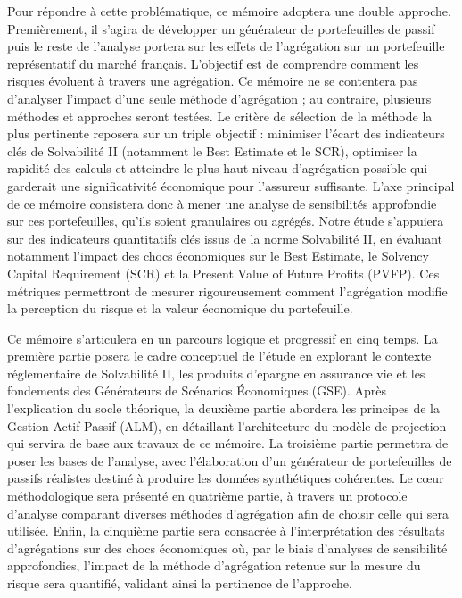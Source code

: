 Pour répondre à cette problématique, ce mémoire adoptera une double approche. Premièrement, il s'agira de développer un générateur de portefeuilles de passif puis le reste de l'analyse portera sur les effets de l'agrégation sur un portefeuille représentatif du marché français. L'objectif est de comprendre comment les risques évoluent à travers une agrégation. Ce mémoire ne se contentera pas d'analyser l'impact d'une seule méthode d'agrégation ; au contraire, plusieurs méthodes et approches seront testées. Le critère de sélection de la méthode la plus pertinente reposera sur un triple objectif : minimiser l'écart des indicateurs clés de Solvabilité II (notamment le Best Estimate et le SCR), optimiser la rapidité des calculs et atteindre le plus haut niveau d'agrégation possible qui garderait une significativité économique pour l'assureur suffisante. L'axe principal de ce mémoire consistera donc à mener une analyse de sensibilités approfondie sur ces portefeuilles, qu'ils soient granulaires ou agrégés. Notre étude s'appuiera sur des indicateurs quantitatifs clés issus de la norme Solvabilité II, en évaluant notamment l'impact des chocs économiques sur le Best Estimate, le Solvency Capital Requirement (SCR) et la Present Value of Future Profits (PVFP). Ces métriques permettront de mesurer rigoureusement comment l'agrégation modifie la perception du risque et la valeur économique du portefeuille.

Ce mémoire s'articulera en un parcours logique et progressif en cinq temps. La première partie posera le cadre conceptuel de l'étude en explorant le contexte réglementaire de Solvabilité II, les produits d'epargne en assurance vie et les fondements des Générateurs de Scénarios Économiques (GSE). Après l'explication du socle théorique, la deuxième partie abordera les principes de la Gestion Actif-Passif (ALM), en détaillant l'architecture du modèle de projection qui servira de base aux travaux de ce mémoire. La troisième partie permettra de poser les bases de l'analyse, avec l'élaboration d'un générateur de portefeuilles de passifs réalistes destiné à produire les données synthétiques cohérentes. Le cœur méthodologique sera présenté en quatrième partie, à travers un protocole d'analyse comparant diverses méthodes d'agrégation afin de choisir celle qui sera utilisée. Enfin, la cinquième partie sera consacrée à l'interprétation des résultats d'agrégations sur des chocs économiques où, par le biais d'analyses de sensibilité approfondies, l'impact de la méthode d'agrégation retenue sur la mesure du risque sera quantifié, validant ainsi la pertinence de l'approche.